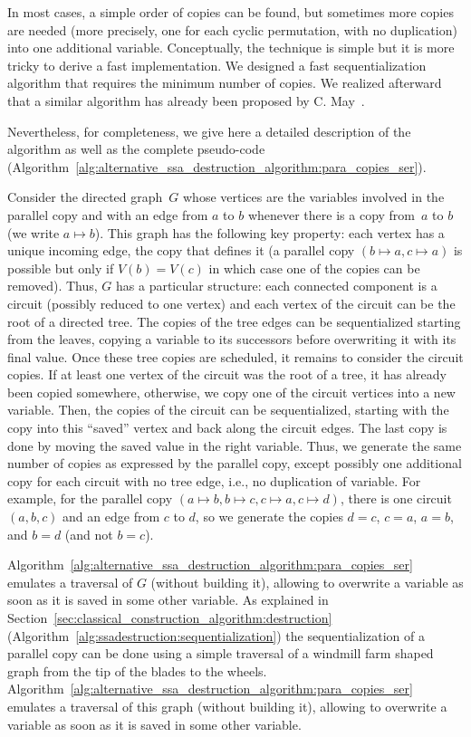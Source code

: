 \ifhab
In most cases, a simple order of copies can be found, but sometimes more copies
are needed (more precisely, one for each cyclic permutation, with no
duplication) into one additional variable. Conceptually, the technique is
simple but it is more tricky to derive a fast implementation.  We designed a
fast sequentialization algorithm that requires the minimum number of copies.
We realized afterward that a similar algorithm has already been proposed by C.
May~\cite{May89}.

Nevertheless, for completeness, we give here a detailed description of
the algorithm as well as the complete pseudo-code
(Algorithm~\ref{alg:alternative_ssa_destruction_algorithm:para_copies_ser}).

Consider the directed graph~$G$ whose vertices are the variables
involved in the parallel copy and with an edge from $a$ to $b$
whenever there is a copy from~$a$ to $b$ (we write $a \mapsto
b$). This graph has the following key property: each vertex has a
unique incoming edge, the copy that defines it (a parallel copy $(b
\mapsto a, c \mapsto a)$ is possible but only if $V(b)=V(c)$ in which
case one of the copies can be removed). Thus, $G$ has a particular
structure: each connected component is a circuit (possibly reduced to
one vertex) and each vertex of the circuit can be the root of a
directed tree. The copies of the tree edges can be sequentialized
starting from the leaves, copying a variable to its successors before
overwriting it with its final value. Once these tree copies are
scheduled, it remains to consider the circuit copies. If at least one
vertex of the circuit was the root of a tree, it has already been
copied somewhere, otherwise, we copy one of the circuit vertices into
a new variable.  Then, the copies of the circuit can be
sequentialized, starting with the copy into this ``saved'' vertex and
back along the circuit edges. The last copy is done by moving the
saved value in the right variable. Thus, we generate the same number
of copies as expressed by the parallel copy, except possibly one
additional copy for each circuit with no tree edge, i.e., no
duplication of variable.  For example, for the parallel copy $(a
\mapsto b, b \mapsto c, c \mapsto a, c \mapsto d)$, there is one
circuit $(a,b,c)$ and an edge from $c$ to $d$, so we generate the
copies $d=c$, $c=a$, $a=b$, and $b=d$ (and not $b=c$).

Algorithm~\ref{alg:alternative_ssa_destruction_algorithm:para_copies_ser} emulates a traversal of $G$ (without
building it), allowing to overwrite a variable as soon as it is saved in some
other variable.  
\else
As explained in Section~\ref{sec:classical_construction_algorithm:destruction} (Algorithm~\ref{alg:ssadestruction:sequentialization}) the sequentialization of a parallel copy can be done using a simple traversal of a windmill farm shaped graph from the tip of the blades to the wheels. Algorithm~\ref{alg:alternative_ssa_destruction_algorithm:para_copies_ser} emulates a traversal of this graph (without building it), allowing to overwrite a variable as soon as it is saved in some
other variable.  
\fi

